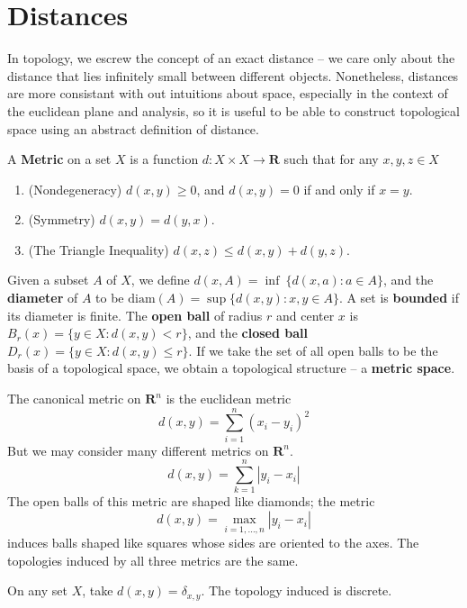 \chapter{Distances}

In topology, we escrew the concept of an exact distance -- we care only about the distance that lies infinitely small between different objects. Nonetheless, distances are more consistant with out intuitions about space, especially in the context of the euclidean plane and analysis, so it is useful to be able to construct topological space using an abstract definition of distance.

\begin{definition}
    A {\bf Metric} on a set $X$ is a function $d: X \times X \to \mathbf{R}$ such that for any $x,y,z \in X$
    \begin{enumerate}
        \item (Nondegeneracy) $d(x,y) \geq 0$, and $d(x,y) = 0$ if and only if $x = y$.
        \item (Symmetry) $d(x,y) = d(y,x)$.
        \item (The Triangle Inequality) $d(x,z) \leq d(x,y) + d(y,z)$.
    \end{enumerate}
    Given a subset $A$ of $X$, we define $d(x,A) = \inf\ \{ d(x,a) : a \in A \}$, and the {\bf diameter} of $A$ to be $\text{diam}(A) = \sup \{ d(x,y) : x,y \in A \}$. A set is {\bf bounded} if its diameter is finite. The {\bf open ball} of radius $r$ and center $x$ is $B_r(x) = \{ y \in X : d(x,y) < r \}$, and the {\bf closed ball} $D_r(x) = \{ y \in X : d(x,y) \leq r \}$. If we take the set of all open balls to be the basis of a topological space, we obtain a topological structure -- a {\bf metric space}.
\end{definition}

\begin{example}
    The canonical metric on $\mathbf{R}^n$ is the euclidean metric
    \[ d(x,y) = \sum_{i = 1}^n (x_i - y_i)^2 \]
    But we may consider many different metrics on $\mathbf{R}^n$.
    \[ d(x,y) = \sum_{k = 1}^n |y_i - x_i| \]
    The open balls of this metric are shaped like diamonds; the metric
    \[ d(x,y) = \max_{i = 1,\dots,n} |y_i - x_i| \]
    induces balls shaped like squares whose sides are oriented to the axes. The topologies induced by all three metrics are the same.
\end{example}

\begin{example}
    On any set $X$, take $d(x,y) = \delta_{x,y}$. The topology induced is discrete.
\end{example}

